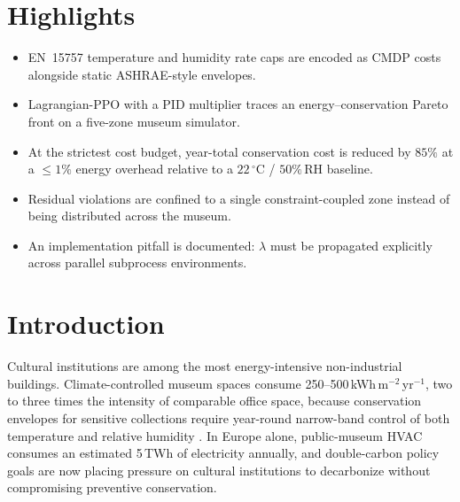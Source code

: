\documentclass[11pt,a4paper]{article}
\begin{document}
\section*{Highlights}
\begin{itemize}[leftmargin=*,nosep]
  \item EN~15757 temperature and humidity rate caps are encoded as CMDP
        costs alongside static ASHRAE-style envelopes.
  \item Lagrangian-PPO with a PID multiplier traces an energy--conservation
        Pareto front on a five-zone museum simulator.
  \item At the strictest cost budget, year-total conservation cost is
        reduced by $85\%$ at a $\le 1\%$ energy overhead relative to a
        $22\,^\circ$C / $50\%$\,RH baseline.
  \item Residual violations are confined to a single constraint-coupled
        zone instead of being distributed across the museum.
  \item An implementation pitfall is documented: $\lambda$ must be
        propagated explicitly across parallel subprocess environments.
\end{itemize}

\section{Introduction}\label{sec:intro}

Cultural institutions are among the most energy-intensive non-industrial
buildings. Climate-controlled museum spaces consume
250--500\,kWh\,m$^{-2}$\,yr$^{-1}$, two to three times the intensity of
comparable office space, because conservation envelopes for sensitive
collections require year-round narrow-band control of both temperature and
relative humidity \citep{ashrae_handbook_ch24,verticchio2024microclimate}.
In Europe alone, public-museum HVAC consumes an estimated 5\,TWh of
electricity annually, and double-carbon policy goals are now placing
pressure on cultural institutions to decarbonize without compromising
preventive conservation.
\end{document}
